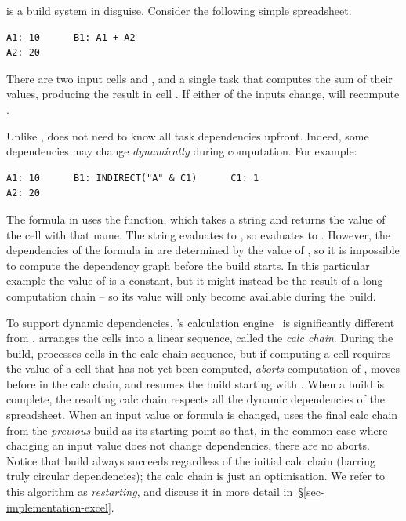 \Excel is a build system in disguise. Consider the following simple spreadsheet.

\vspace{1mm}
\begin{verbatim}
A1: 10      B1: A1 + A2
A2: 20
\end{verbatim}
\vspace{1mm}

\noindent
There are two input cells  and , and a single task that computes
the sum of their values, producing the result in cell . If either of
the inputs change, \Excel will recompute .

Unlike \Make, \Excel does not need to know all task dependencies upfront.
Indeed, some dependencies may change \emph{dynamically} during computation. For
example:

\vspace{0.5mm}
\begin{verbatim}
A1: 10      B1: INDIRECT("A" & C1)      C1: 1
A2: 20
\end{verbatim}
\vspace{0.5mm}

\noindent
The formula in  uses the  function, which takes a string
and returns the value of the cell with that name.  The string evaluates to
, so  evaluates to . However, the dependencies of the
formula in  are determined by the value of , so it is impossible
to compute the dependency graph before the build starts. In this particular
example the value of  is a constant, but
it might instead be the result of a long computation chain --
so its value will only
become available during the build.

To support dynamic dependencies, \Excel's calculation engine~\cite{excel_recalc}
is significantly different from \Make. \Excel arranges the cells into a linear
sequence, called the \emph{calc chain}.  During the build, \Excel processes
cells in the calc-chain sequence, but if computing a cell  requires the
value of a cell  that has not yet been computed, \Excel \emph{aborts}
computation of , moves  before  in the calc chain, and
resumes the build starting with . When a build is complete, the resulting
calc chain respects all the dynamic dependencies of the spreadsheet. When an
input value or formula is changed, \Excel uses the final calc chain from the
\emph{previous} build as its starting point so that, in the common case where
changing an input value does not change dependencies, there are no aborts.
Notice that build always succeeds regardless of the initial calc chain (barring
truly circular dependencies); the calc chain is just an optimisation.
We refer to this algorithm as \emph{restarting}, and discuss it
in more detail in~\S\ref{sec-implementation-excel}.


